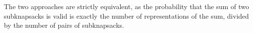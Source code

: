 



The two approaches are strictly equivalent, as the probability that the sum of two subknapsacks is valid is exactly the number of representations of the sum, divided by the number of pairs of subknapsacks.

